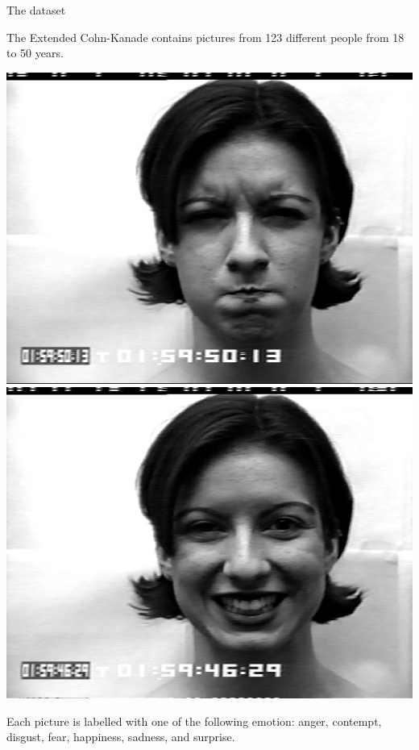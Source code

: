 \begin{frame}{The dataset}

The Extended Cohn-Kanade contains pictures from 123 different people from 18 to 50 years.

\bigskip \includegraphics[width=.48\textwidth]{img/lec5f/S010_004_00000019.png}%
\includegraphics[width=.48\textwidth]{img/lec5f/S010_006_00000015.png}

\bigskip Each picture is labelled with one of the following emotion: anger, contempt, disgust, fear, happiness, sadness, and surprise.
    
\end{frame}